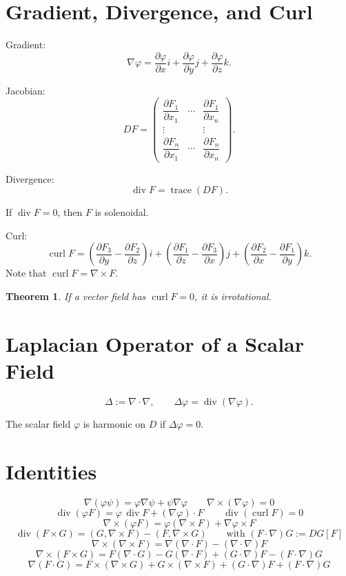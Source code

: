 \documentclass[11pt]{report}
\theoremstyle{definition}
\theoremstyle{plain}
\newtheorem{theorem}[definition]{Theorem}
\theoremstyle{remark}
\newcommand{\ip}[2]{\left(#1,#2\right)}
\newcommand{\grad}{\nabla}
\newcommand{\divergence}{\operatorname{div}}
\newcommand{\curl}{\operatorname{curl}}
\begin{document}
\section{Gradient, Divergence, and Curl}

Gradient:
\[
\grad\varphi = \frac{\partial\varphi}{\partial x}i+\frac{\partial\varphi}{\partial y}j+\frac{\partial\varphi}{\partial z}k.
\]

Jacobian:
\[
DF=
\begin{pmatrix}
\dfrac{\partial F_1}{\partial x_1} & \cdots & \dfrac{\partial F_1}{\partial x_n}\\[0.4em]
\vdots & & \vdots\\[0.4em]
\dfrac{\partial F_n}{\partial x_1} & \cdots & \dfrac{\partial F_n}{\partial x_n}
\end{pmatrix}.
\]

Divergence:
\[
\divergence F = \operatorname{trace}(DF).
\]

If $\divergence F=0$, then $F$ is solenoidal.

Curl:
\[
\curl F = \left(\frac{\partial F_3}{\partial y}-\frac{\partial F_2}{\partial z}\right)i
+ \left(\frac{\partial F_1}{\partial z}-\frac{\partial F_3}{\partial x}\right)j
+ \left(\frac{\partial F_2}{\partial x}-\frac{\partial F_1}{\partial y}\right)k.
\]
Note that $\curl F=\grad\times F$.

\begin{theorem}
If a vector field has $\curl F=0$, it is irrotational.
\end{theorem}

\section{Laplacian Operator of a Scalar Field}

\[
\Delta:=\grad \cdot \grad,
\qquad
\Delta\varphi=\divergence(\grad\varphi).
\]

The scalar field $\varphi$ is harmonic on $D$ if $\Delta\varphi=0$.
\newpage
\section{Identities}

\[
\grad(\varphi\psi)=\varphi\grad\psi+\psi\grad\varphi
\qquad
\grad\times(\grad\varphi)=0
\]
\[
\divergence(\varphi F)=\varphi\,\divergence F+(\grad\varphi)\cdot F
\qquad
\divergence(\curl F)=0
\]
\[
\grad\times(\varphi F)=\varphi(\grad\times F)+\grad\varphi\times F
\]
\[
\divergence(F\times G)=\ip{G}{\grad\times F}-\ip{F}{\grad\times G}
\qquad \text{with } (F\cdot\grad)G:=DG[F]
\]
\[
\grad\times(\grad\times F)=\grad(\grad\cdot F)-(\grad\cdot\grad)F
\]
\[
\grad\times(F\times G)=F(\grad\cdot G)-G(\grad\cdot F)+(G\cdot\grad)F-(F\cdot\grad)G
\]
\[
\grad(F\cdot G)=F\times(\grad\times G)+G\times(\grad\times F)+(G\cdot\grad)F+(F\cdot\grad)G
\]
\end{document}
